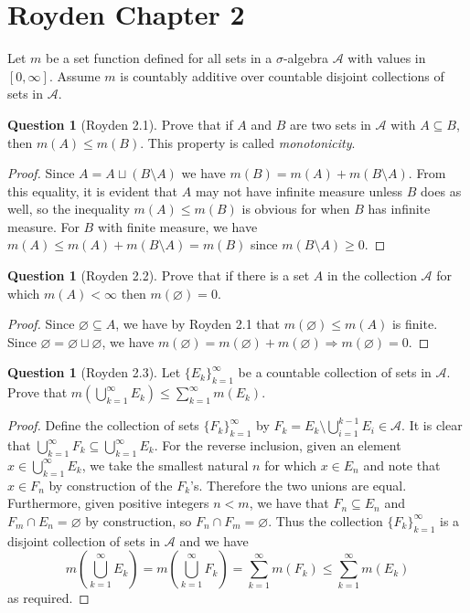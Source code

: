 \documentclass{article}
\renewcommand{\implies}{\Rightarrow}
\theoremstyle{definition} %
\numberwithin{thm}{section} %
\theoremstyle{definition} %
\newtheorem{question}[thm]{Question}
\begin{document}
\section{Royden Chapter 2}

Let $m$ be a set function defined for all sets in a $\sigma$-algebra $\mathcal{A}$ with values in $[0, \infty]$. Assume $m$ is countably additive over countable disjoint collections of sets in $\mathcal{A}$.

\begin{question}[Royden 2.1]
Prove that if $A$ and $B$ are two sets in $\mathcal{A}$ with $A \subseteq B$, then $m(A) \leq m(B)$. This property is called \textit{monotonicity}.
\end{question}
\begin{proof}
Since $A = A \sqcup (B \setminus A)$ we have $m(B) = m(A) + m(B \setminus A)$. From this equality, it is evident that $A$ may not have infinite measure unless $B$ does as well, so the inequality $m(A) \leq m(B)$ is obvious for when $B$ has infinite measure. For $B$ with finite measure, we have $m(A) \leq m(A) + m(B \setminus A) = m(B)$ since $m(B \setminus A) \geq 0$.
\end{proof}

\begin{question}[Royden 2.2]
Prove that if there is a set $A$ in the collection $\mathcal{A}$ for which $m(A) < \infty$ then $m(\varnothing) = 0$.
\end{question}
\begin{proof}
Since $\varnothing \subseteq A$, we have by Royden 2.1 that $m(\varnothing) \leq m(A)$ is finite. Since $\varnothing = \varnothing \sqcup \varnothing$, we have $m(\varnothing) = m(\varnothing) + m(\varnothing) \implies m(\varnothing) = 0$.
\end{proof}

\begin{question}[Royden 2.3]
Let ${\{E_k\}}_{k = 1}^\infty$ be a countable collection of sets in $\mathcal{A}$. Prove that $m(\bigcup_{k = 1}^\infty E_k) \leq \sum_{k = 1}^\infty m(E_k)$.
\end{question}
\begin{proof}
Define the collection of sets ${\{F_k\}}_{k = 1}^\infty$ by $F_k = E_k \setminus \bigcup_{i = 1}^{k - 1} E_i \in \mathcal{A}$. It is clear that $\bigcup_{k = 1}^\infty F_k \subseteq \bigcup_{k = 1}^\infty E_k$. For the reverse inclusion, given an element $x \in \bigcup_{k = 1}^\infty E_k$, we take the smallest natural $n$ for which $x \in E_n$ and note that $x \in F_n$ by construction of the $F_k$'s. Therefore the two unions are equal. Furthermore, given positive integers $n < m$, we have that $F_n \subseteq E_n$ and $F_m \cap E_n = \varnothing$ by construction, so $F_n \cap F_m = \varnothing$. Thus the collection ${\{F_k\}}_{k = 1}^\infty$ is a disjoint collection of sets in $\mathcal{A}$ and we have
\[ m\left(\bigcup_{k = 1}^\infty E_k\right) = m\left(\bigcup_{k = 1}^\infty F_k\right) = \sum_{k = 1}^\infty m(F_k) \leq \sum_{k = 1}^\infty m(E_k) \]
as required.
\end{proof}
\end{document}

